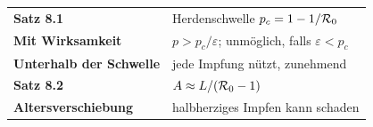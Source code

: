 \begin{merksatz}
\begin{center}
\renewcommand{\arraystretch}{1.5}
\begin{tabular}{@{}P{3.4cm}P{5.2cm}@{}}
\toprule
\textbf{Satz 8.1} & Herdenschwelle $p_c = 1-1/\mathcal{R}_0$\\
\textbf{Mit Wirksamkeit} & $p > p_c/\varepsilon$; unmöglich, falls $\varepsilon < p_c$\\
\textbf{Unterhalb der Schwelle} & jede Impfung nützt, zunehmend\\
\textbf{Satz 8.2} & $A \approx L/(\mathcal{R}_0-1)$\\
\textbf{Alters\-verschiebung} & halbherziges Impfen kann schaden\\
\bottomrule
\end{tabular}
\end{center}

\begin{center}
\begin{minipage}{0.88\textwidth}
\end{minipage}
\end{center}
\end{merksatz}
